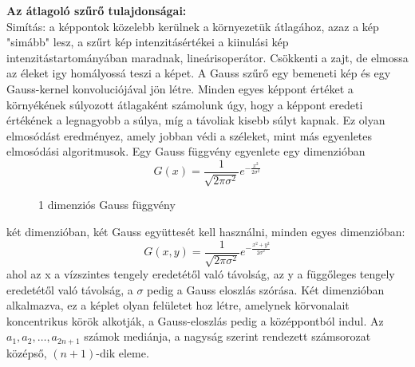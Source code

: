 \textbf{Az átlagoló szűrő tulajdonságai:}\\
Simítás: a képpontok közelebb kerülnek a környezetük átlagához, azaz a kép "simább" lesz, a szűrt kép intenzitásértékei a kiinulási kép intenzitástartományában maradnak, lineárisoperátor. Csökkenti a zajt, de elmossa az éleket igy homályossá teszi a képet.
A Gauss szűrő egy bemeneti kép és egy Gauss-kernel konvoluciójával jön létre. Minden egyes képpont értéket a környékének súlyozott átlagaként számolunk úgy, hogy a képpont eredeti értékének a legnagyobb a súlya, míg a távoliak kisebb súlyt kapnak. Ez olyan elmosódást eredményez, amely jobban védi a széleket, mint más egyenletes elmosódási algoritmusok. Egy Gauss függvény egyenlete egy dimenzióban
$$G(x)=\frac{1}{\sqrt{2\pi\sigma^{2}}}e^{-\frac{x^{2}}{2\sigma^{2}}} $$
\begin{figure}[ht]
\centering
{}
\caption{1 dimenziós Gauss függvény} 
\label{fig: gaussgorbe}
\end{figure}
két dimenzióban, két Gauss együttesét kell használni, minden egyes dimenzióban: 
$$G(x,y)=\frac{1}{\sqrt{2\pi\sigma^{2}}}e^{-\frac{x^{2}+y^{2}}{2\sigma^{2}}} $$
ahol az x a vízszintes tengely eredetétől való távolság, az y a függőleges tengely eredetétől való távolság, a $\sigma$ pedig a Gauss eloszlás szórása. Két dimenzióban alkalmazva, ez a képlet olyan felületet hoz létre, amelynek körvonalait koncentrikus körök alkotják, a Gauss-eloszlás pedig a középpontból indul.
Az $a_1,a_2,\dots,a_{2n+1}$ számok mediánja, a nagyság szerint rendezett számsorozat középső, $(n+1)$-dik eleme.\\
\\
